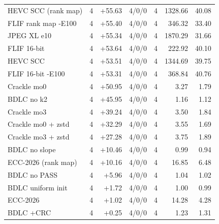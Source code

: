\begin{table}[t]
\begin{tabular}{lrrrrrr}
HEVC SCC (rank map) & 4 & +55.63 & 4/0/0 & 4 & 1328.66 & 40.08 \\
FLIF rank map -E100 & 4 & +55.40 & 4/0/0 & 4 & 346.32 & 33.40 \\
JPEG XL e10 & 4 & +55.34 & 4/0/0 & 4 & 1870.29 & 31.66 \\
FLIF 16-bit & 4 & +53.64 & 4/0/0 & 4 & 222.92 & 40.10 \\
HEVC SCC & 4 & +53.51 & 4/0/0 & 4 & 1344.69 & 39.75 \\
FLIF 16-bit -E100 & 4 & +53.31 & 4/0/0 & 4 & 368.84 & 40.76 \\
Crackle mo0 & 4 & +50.95 & 4/0/0 & 4 & 3.27 & 1.79 \\
BDLC no k2 & 4 & +45.95 & 4/0/0 & 4 & 1.16 & 1.12 \\
Crackle mo3 & 4 & +39.24 & 4/0/0 & 4 & 3.50 & 1.84 \\
Crackle mo0 + zstd & 4 & +32.29 & 4/0/0 & 4 & 3.55 & 1.69 \\
Crackle mo3 + zstd & 4 & +27.28 & 4/0/0 & 4 & 3.75 & 1.89 \\
BDLC no slope & 4 & +10.46 & 4/0/0 & 4 & 0.99 & 0.94 \\
ECC-2026 (rank map) & 4 & +10.16 & 4/0/0 & 4 & 16.85 & 6.48 \\
BDLC no PASS & 4 & +5.96 & 4/0/0 & 4 & 1.04 & 1.02 \\
BDLC uniform init & 4 & +1.72 & 4/0/0 & 4 & 1.00 & 0.99 \\
ECC-2026 & 4 & +1.02 & 4/0/0 & 4 & 14.28 & 4.28 \\
BDLC +CRC & 4 & +0.25 & 4/0/0 & 4 & 1.23 & 1.31 \\
\hline
\end{tabular}
\end{table}
